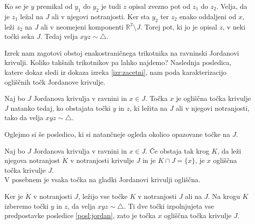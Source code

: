 \documentclass[mat1]{fmfdelo}
\newcommand{\R}{\mathbb R}
\begin{document}
Ko se je $y$ premikal od $y_1$ do $y_2$ je tudi $z$ opisal zvezno pot od $z_1$ do $z_2$. Velja, da je $z_1$ ležal na $J$ ali v njegovi notranjosti. Ker sta $y_2$ ter $z_2$ enako oddaljeni od $x$, leži $z_2$ na $J$ ali v neomejeni komponenti $\R^2 \setminus J$. Torej pot, ki jo je opisal $z$, v neki točki seka $J$. Tedaj velja $xyz \sim \triangle$.

\begin{center}
\end{center}
\endproof

Izrek nam zagotovi obstoj enakostraničnega trikotnika na ravninski Jordanovi krivulji. Koliko takšnih trikotnikov pa lahko najdemo? Naslednja posledica, katere dokaz sledi iz dokaza izreka \ref{izr:zacetni}, nam poda karakterizacijo ogliščnih točk Jordanove krivulje.
\begin{posledica}\label{posl:jordan}
Naj bo $J$ Jordanova krivulja v ravnini in $x \in J$. Točka $x$ je ogliščna točka krivulje $J$ natanko tedaj, ko obstajata točki $y$ in $z$, ki ležita na $J$ ali v njegovi notranjosti, tako da velja $xyz \sim \triangle$.
\end{posledica}

Oglejmo si še posledico, ki si natančneje ogleda okolico opazovane točke na $J$.
\begin{posledica}
Naj bo $J$ Jordanova krivulja v ravnini in $x \in J$. Če obstaja tak krog $K$, da leži njegova notranjost $\mathring{K}$ v notranjosti krivulje $J$ in je $K \cap J = \{x\}$, je $x$ ogliščna točka krivulje $J$.\\
V posebnem je vsaka točka na gladki Jordanovi krivulji ogliščna.
\end{posledica}
\proof
Ker je $\mathring{K}$ v notranjosti $J$, ležijo vse točke $K$ v notranjosti $J$ ali na $J$. Na krogu $K$ izberemo točki $y$ in $z$, da velja $xyz \sim \triangle$. Ti dve točki izpolnjujeta vse predpostavke posledice \ref{posl:jordan}, zato je točka $x$ ogliščna točka krivulje $J$.
\endproof
\end{document}
